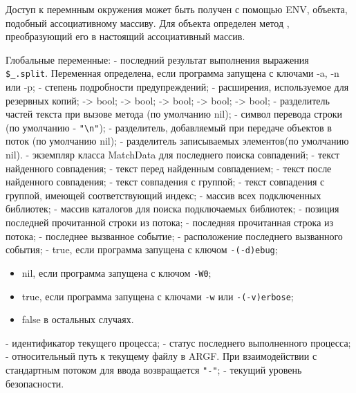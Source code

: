 Доступ к перемнным окружения может быть получен с помощью ENV, объекта, подобный ассоциативному массиву. Для объекта определен метод , преобразующий его в настоящий ассоциативный массив.

\begin{keylist}{Глобальные переменные:}
   - последний результат выполнения выражения \verb!$_.split!. Переменная определена, если программа запущена с ключами -a, -n или -p;
   - степень подробности предупреждений; 
   - расширения, используемое для резервных копий;
   -> bool; 
   -> bool; 
   -> bool; 
   -> bool; 
   -> bool;
   - разделитель частей текста при вызове метода  (по умолчанию nil);
   - символ перевода строки (по умолчанию - \verb!"\n"!);
  \key{\$\textbackslash} - разделитель, добавляемый при передаче объектов в поток (по умолчанию nil); 
  \key{\$,} - разделитель записываемых элементов(по умолчанию nil).
  \key{\$\textasciitilde} - экземпляр класса MatchData для последнего поиска совпадений; 
  \key{\$\&} - текст найденного совпадения; 
   - текст перед найденным совпадением; 
   - текст после найденного совпадения; 
  \key{\$+} - текст совпадения с группой; 
   - текст совпадения с группой, имеющей соответствующий индекс;
   - массив всех подключенных библиотек;
   - массив каталогов для поиска подключаемых библиотек;
   - позиция последней прочитанной строки из потока; 
  \key{\$_} - последняя прочитанная строка из потока;
  \key{\$!} - последнее вызванное событие; 
   - расположение последнего вызванного события;
   - true, если программа запущена с ключом \verb!-(-d)ebug!;
 
  \begin{itemize}
    \item nil, если программа запущена с ключом \verb!-W0!;
    \item true, если программа запущена с ключами \verb!-w! или \verb!-(-v)erbose!;
    \item false в остальных случаях.
  \end{itemize}    
  
  \key{\$\$} - идентификатор текущего процесса;
   - статус последнего выполненного процесса;
   - относительный путь к текущему файлу в ARGF. При взаимодействии с стандартным потоком для ввода возвращается \verb!"-"!;
   - текущий уровень безопасности.
\end{keylist}    